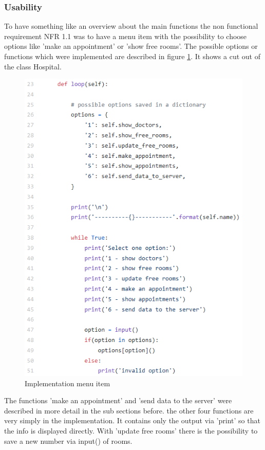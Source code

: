 \subsubsection{Usability}
To have something like an overview about the main functions the non functional requirement NFR 1.1 was to have a menu item with the possibility to choose options like 'make an appointment' or 'show free rooms'. The possible options or functions which were implemented are described in figure \ref{Options}. It shows a cut out of the class Hospital.

\begin{figure}[H]
\centering
\sidecaption
\includegraphics[scale=.65]{images/melanie_images/Options.png}
\caption{Implementation menu item}
\label{Options}
\end{figure}

The functions 'make an appointment' and 'send data to the server' were described in more detail in the sub sections before. the other four functions are very simply in the implementation. It contains only the output via 'print' so that the info is displayed directly. With 'update free rooms' there is the possibility to save a new number via input() of rooms.

